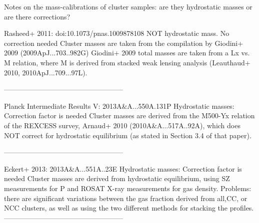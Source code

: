 Notes on the mass-calibrations of cluster samples: are they hydrostatic masses or are there corrections?

Rasheed+ 2011:  doi:10.1073/pnas.1009878108 
NOT hydrostatic mass. No correction needed
Cluster masses are taken from the compilation by Giodini+ 2009 (2009ApJ...703..982G)
Giodini+ 2009 total masses are taken from a Lx vs. M relation, where M is derived from stacked weak lensing analysis (Leauthaud+ 2010, 
2010ApJ...709...97L).

---------------------------------------------------

Planck Intermediate Results V: 2013A&A...550A.131P
Hydrostatic masses: Correction factor is needed
Cluster masses are derived from the M500-Yx relation of the REXCESS survey, Arnaud+ 2010 (2010A&A...517A..92A), which does NOT correct for hydrostatic equilibrium (as stated in Section 3.4 of that paper). 

---------------------------------------------------

Eckert+ 2013: 2013A&A...551A..23E
Hydrostatic masses: Correction factor is needed
Cluster masses are derived from hydrostatic equilibrium, using SZ measurements for P and ROSAT X-ray measurements for gas density. 
Problems: there are significant variations between the gas fraction derived from all,CC, or NCC clusters, as well as using the two different methods for stacking the profiles. 
---------------------------------------------------
